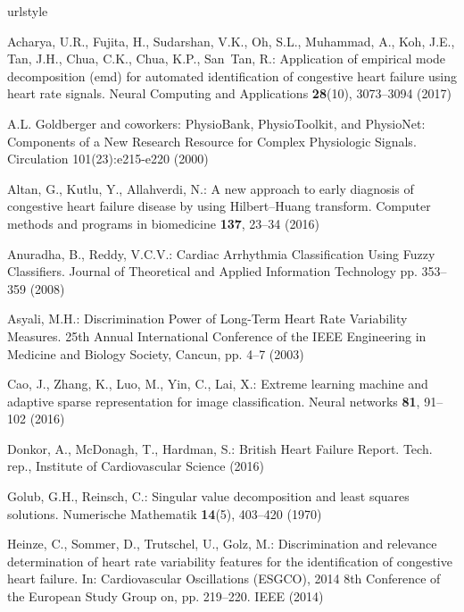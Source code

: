 \documentclass[twocolumn]{svjour3}
\begin{document}
      \begin{thebibliography}{10}
\providecommand{\url}[1]{{#1}}
\providecommand{\urlprefix}{URL }
\expandafter\ifx\csname urlstyle\endcsname\relax
  \providecommand{\doi}[1]{DOI~\discretionary{}{}{}#1}\else
  \providecommand{\doi}{DOI~\discretionary{}{}{}\begingroup
  \urlstyle{rm}\Url}\fi

Acharya, U.R., Fujita, H., Sudarshan, V.K., Oh, S.L., Muhammad, A., Koh, J.E.,
  Tan, J.H., Chua, C.K., Chua, K.P., San~Tan, R.: Application of empirical mode
  decomposition (emd) for automated identification of congestive heart failure
  using heart rate signals.
\newblock Neural Computing and Applications \textbf{28}(10), 3073--3094 (2017)

{A.L. Goldberger and coworkers}: {PhysioBank, PhysioToolkit, and PhysioNet:
  Components of a New Research Resource for Complex Physiologic Signals}.
\newblock Circulation 101(23):e215-e220  (2000)

Altan, G., Kutlu, Y., Allahverdi, N.: {A new approach to early diagnosis of
  congestive heart failure disease by using Hilbert--Huang transform}.
\newblock Computer methods and programs in biomedicine \textbf{137}, 23--34
  (2016)

Anuradha, B., Reddy, V.C.V.: {Cardiac Arrhythmia Classification Using Fuzzy
  Classifiers}.
\newblock Journal of Theoretical and Applied Information Technology pp.
  353--359 (2008)

Asyali, M.H.: {Discrimination Power of Long-Term Heart Rate Variability
  Measures}.
\newblock 25th Annual International Conference of the IEEE Engineering in
  Medicine and Biology Society, Cancun, pp. 4--7 (2003)

Cao, J., Zhang, K., Luo, M., Yin, C., Lai, X.: {Extreme learning machine and
  adaptive sparse representation for image classification}.
\newblock Neural networks \textbf{81}, 91--102 (2016)

Donkor, A., McDonagh, T., Hardman, S.: {British Heart Failure Report}.
\newblock Tech. rep., Institute of Cardiovascular Science (2016)

Golub, G.H., Reinsch, C.: {Singular value decomposition and least squares
  solutions}.
\newblock Numerische Mathematik \textbf{14}(5), 403--420 (1970)

Heinze, C., Sommer, D., Trutschel, U., Golz, M.: Discrimination and relevance
  determination of heart rate variability features for the identification of
  congestive heart failure.
\newblock In: Cardiovascular Oscillations (ESGCO), 2014 8th Conference of the
  European Study Group on, pp. 219--220. IEEE (2014)


\end{thebibliography}
\end{document}
